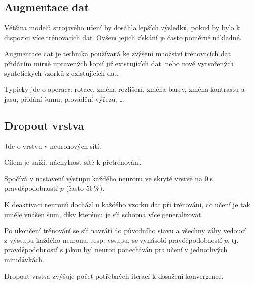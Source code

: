 \subsection{Augmentace dat}

\begin{compactitem}
    \item Většina modelů strojového učení by dosáhla lepších výsledků, pokud by bylo k dispozici více trénovacích dat. Ovšem jejich získání je často poměrně nákladné.

    \item Augmentace dat je technika používaná ke zvýšení množství trénovacích dat přidáním mírně upravených kopií již existujících dat, nebo nově vytvořených syntetických vzorků z existujících dat.

    \item Typicky jde o operace: rotace, změna rozlišení, změna barev, změna kontrastu a jasu, přidání šumu, provádění výřezů, \dots
\end{compactitem}

\subsection{Dropout vrstva}

\begin{compactitem}
    \item Jde o vrstvu v neuronových sítí.

    \item Cílem je snížit náchylnost sítě k přetrénování.

    \item Spočívá v nastavení výstupu každého neuronu ve skryté vrstvě na $0$ s pravděpodobností $p$ (často $50\,\%$).

    \item K deaktivaci neuronů dochází u každého vzorku dat při trénování, do učení je tak uměle vnášen šum, díky kterému je síť schopna více generalizovat.

    \item Po ukončení trénování se síť navrátí do původního stavu a všechny váhy vedoucí z výstupu každého neuronu, resp. vstupu, se vynásobí pravděpodobností $p$, tj. pravděpodobností s jakou byl neuron ponecháván pro učení v jednotlivých minidávkách.

    \item Dropout vrstva zvýšuje počet potřebných iterací k dosažení konvergence.
\end{compactitem}
